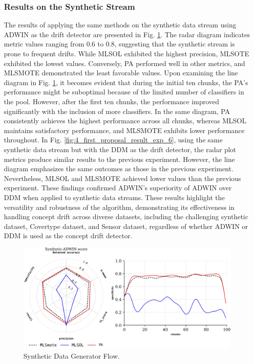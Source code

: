 \subsubsection{Results on the Synthetic Stream}
The results of applying the same methods on the synthetic data stream using ADWIN as the drift detector are presented in Fig. \ref{fig:4_first_proposal_result_exp_5}. The radar diagram indicates metric values ranging from 0.6 to 0.8, suggesting that the synthetic stream is prone to frequent drifts. While MLSOL exhibited the highest precision, MLSOTE exhibited the lowest values. Conversely, PA performed well in other metrics, and MLSMOTE demonstrated the least favorable values. Upon examining the line diagram in Fig. \ref{fig:4_first_proposal_result_exp_5}, it becomes evident that during the initial ten chunks, the PA's performance might be suboptimal because of the limited number of classifiers in the pool. However, after the first ten chunks, the performance improved significantly with the inclusion of more classifiers. In the same diagram, PA consistently achieves the highest performance across all chunks, whereas MLSOL maintains satisfactory performance, and MLSMOTE exhibits lower performance throughout. In Fig. \ref{fig:4_first_proposal_result_exp_6}, using the same synthetic data stream but with the DDM as the drift detector, the radar plot metrics produce similar results to the previous experiment. However, the line diagram emphasizes the same outcomes as those in the previous experiment. Nevertheless, MLSOL and MLSMOTE achieved lower values than the previous experiment. These findings confirmed ADWIN's superiority of ADWIN over DDM when applied to synthetic data streams. These results highlight the versatility and robustness of the algorithm, demonstrating its effectiveness in handling concept drift across diverse datasets, including the challenging synthetic dataset, Covertype dataset, and Sensor dataset, regardless of whether ADWIN or DDM is used as the concept drift detector.

\begin{figure}[!ht]
	\centering
	\includegraphics[width=1\linewidth]{4_Imbalanced/figures/exp_5.png}
	\caption{Synthetic Data Generator Flow.}
	\label{fig:4_first_proposal_result_exp_5}
\end{figure}

